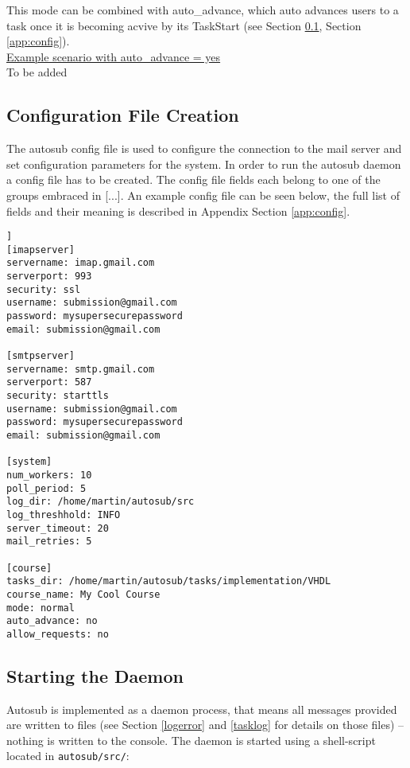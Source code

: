 This mode can be combined with auto\_advance, which auto advances users to a task once it is becoming acvive by its
TaskStart (see Section \ref{sub:exampleconfig}, Section \ref{app:config}). \\

\underline{Example scenario with auto\_advance = yes}\\
To be added

\subsection{Configuration File Creation} \label{sub:exampleconfig}
The autosub config file is used to configure the connection to the mail server and set
configuration parameters for the system. In order to run the autosub daemon a config file
has to be created. The config file fields each belong to one of the groups embraced
in [...]. An example config file can be seen below, the full list of fields and their
meaning is described in Appendix Section \ref{app:config}.

\begin{lstlisting}[frame=single,captionpos=b,caption=example.cfg, belowcaptionskip=4pt]]
[imapserver]
servername: imap.gmail.com
serverport: 993
security: ssl
username: submission@gmail.com
password: mysupersecurepassword
email: submission@gmail.com

[smtpserver]
servername: smtp.gmail.com
serverport: 587
security: starttls
username: submission@gmail.com
password: mysupersecurepassword
email: submission@gmail.com

[system]
num_workers: 10
poll_period: 5
log_dir: /home/martin/autosub/src
log_threshhold: INFO
server_timeout: 20
mail_retries: 5

[course]
tasks_dir: /home/martin/autosub/tasks/implementation/VHDL
course_name: My Cool Course
mode: normal
auto_advance: no
allow_requests: no
\end{lstlisting}

\subsection{Starting the Daemon}

Autosub is implemented as a daemon process, that means all messages provided are written
to files (see Section \ref{logerror} and \ref{tasklog} for details on those files) --
nothing is written to the console. The daemon is started using a shell-script located
in {\tt autosub/src/}:

